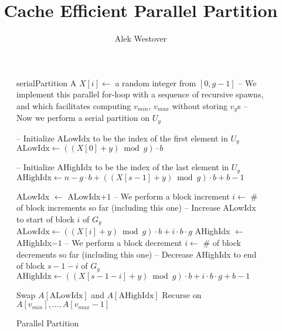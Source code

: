 \documentclass[11pt]{article}
\author{Alek Westover}
\title{Cache Efficient Parallel Partition}
\begin{document}
\begin{figure*}
	\caption{Parallel Partition}
	\label{alg:parallelPartition}
	\begin{algorithmic}[1]
			\State serialPartition A
		\Else
				\State $X[i] \gets$ a random integer from $[0,g-1]$ 
			\EndFor
			\State -- We implement this parallel for-loop with a sequence of recursive spawns, and which facilitates computing $v_{min}$, $v_{max}$ without storing $v_y$s
				\State -- Now we perform a serial partition on $U_y$

				\State -- Initialize ALowIdx to be the index of the first element in $U_y$
				\State $\text{ALowIdx} \gets ((X[0]+y) \bmod g)\cdot b$

				\State -- Initialize AHighIdx to be the index of the last element in $U_y$
				\State $\text{AHighIdx} \gets n - g\cdot b + ((X[s-1]+y) \bmod g)\cdot b + b-1$

						\State ALowIdx $\gets$ ALowIdx$+1$
							\State -- We perform a block increment
							\State $i \gets $ \# of block increments so far (including this one)
							\State -- Increase ALowIdx to start of block $i$ of $G_y$
							\State $\text{ALowIdx} \gets ((X[i] + y)\bmod g) \cdot b + i\cdot b\cdot g$
						\EndIf
					\EndWhile
						\State AHighIdx $\gets$ AHighIdx$-1$
							\State -- We perform a block decrement
							\State $i \gets $ \# of block decrements so far (including this one)
							\State -- Decrease AHighIdx to end of block $s-1-i$ of $G_y$
							\State $\text{AHighIdx} \gets ((X[s-1-i] + y)\bmod g) \cdot b + i\cdot b\cdot g + b - 1$
						\EndIf
					\EndWhile

					\State Swap $A[\text{ALowIdx}]$ and $A[\text{AHighIdx}]$
				\EndWhile
			\EndFor
			\State Recurse on $A[v_{min}],\ldots,A[v_{max}-1]$
		\EndIf
	\end{algorithmic}	
\end{figure*}
\end{document}
